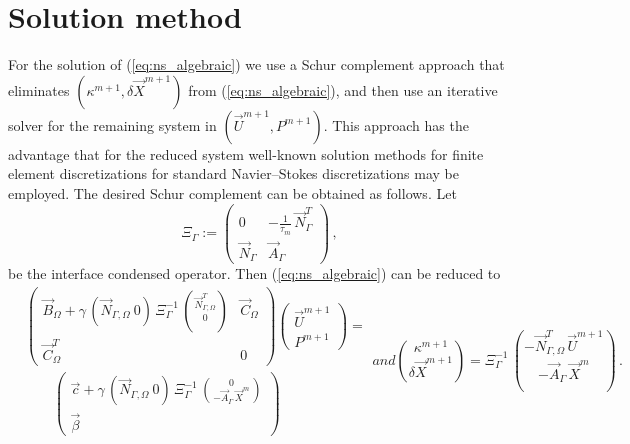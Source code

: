 \documentclass[a4paper,12pt,onecolumn]{article}
\newcommand{\NbulkT}{\vec{N}_{\Gamma,\Omega}^T}
\newcommand{\Nbulk}{\vec{N}_{\Gamma,\Omega}}
\begin{document}
\section{Solution method}\label{sec:solution_method}
For the solution of (\ref{eq:ns_algebraic}) we use a Schur complement
approach that eliminates $(\kappa^{m+1}, \delta \vec X^{m+1})$ from
(\ref{eq:ns_algebraic}), and then use an iterative solver for the remaining
system in $(\vec U^{m+1}, P^{m+1})$. This approach has the advantage that for
the reduced system well-known solution methods for finite element
discretizations for standard Navier--Stokes discretizations may be employed.
The desired Schur complement can be obtained as follows. Let
\begin{equation} \label{eq:Xi}
\Xi_\Gamma:= \begin{pmatrix}
 0 & - \frac1{\tau_m}\,\vec N_\Gamma^T \\
\vec N_\Gamma & \vec A_\Gamma
\end{pmatrix} \,,
\end{equation}
be the interface condensed operator. Then (\ref{eq:ns_algebraic}) can be
reduced to
\begin{subequations}
\begin{align}\label{eq:SchurkX}
&
\begin{pmatrix}
\vec B_\Omega + \gamma\,(\Nbulk \ 0)\,\Xi_\Gamma^{-1}\,
\binom{\NbulkT}{0} & \vec C_\Omega \\
\vec C_\Omega^T & 0
\end{pmatrix}
\begin{pmatrix}
\vec U^{m+1} \\ P^{m+1}
\end{pmatrix}
= \nonumber \\
& \qquad
\begin{pmatrix}
\vec c
+\gamma\,(\Nbulk \ 0)\, \Xi_\Gamma^{-1}\,
\binom{0}{-\vec A_\Gamma\,\vec X^m} \\
\vec \beta
\end{pmatrix}
\end{align}
and
\begin{equation}
\binom{\kappa^{m+1}}{\delta\vec X^{m+1}} = \Xi_\Gamma^{-1}\,
\binom{-\NbulkT\,\vec U^{m+1}}{-\vec A_\Gamma\,\vec X^m}\,.
\label{eq:SchurkXb}
\end{equation}
\end{subequations}
\end{document}
